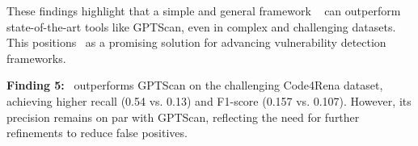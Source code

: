 These findings highlight that a simple and general framework \tool~ can outperform state-of-the-art tools like GPTScan, even in complex and challenging datasets. 
This positions \tool~as a promising solution for advancing vulnerability detection frameworks.

\begin{tcolorbox}[colback=gray!20!white, colframe=gray!75!black, boxsep=5pt, arc=4pt, boxrule=1pt, left=0pt, right=0pt] 
\textbf{Finding 5:}
\tool~outperforms GPTScan on the challenging Code4Rena dataset, achieving higher recall (0.54 vs. 0.13) and F1-score (0.157 vs. 0.107). However, its precision remains on par with GPTScan, reflecting the need for further refinements to reduce false positives.
\end{tcolorbox}
